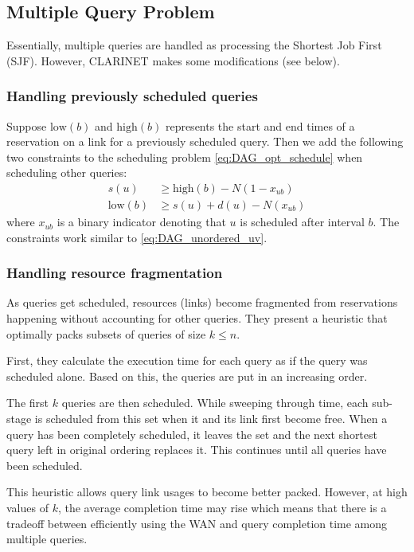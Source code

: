 \subsection{Multiple Query Problem}

Essentially, multiple queries are handled as processing the Shortest Job First (SJF).
However, CLARINET makes some modifications (see below).


\subsubsection{Handling previously scheduled queries}

Suppose $\text{low}(b)$ and $\text{high}(b)$ represents the start and end times of a reservation on a link for a previously scheduled query.
Then we add the following two constraints to the scheduling problem \eqref{eq:DAG_opt_schedule} when scheduling other queries:
\begin{subequations}
	\begin{align}
		s(u) & \geq \text{high}(b) - N(1-x_{ub}) \\
		\text{low}(b) & \geq s(u) + d(u) - N(x_{ub})
	\end{align}
\end{subequations}
where $x_{ub}$ is a binary indicator denoting that $u$ is scheduled after interval $b$.
The constraints work similar to \eqref{eq:DAG_unordered_uv}.


\subsubsection{Handling resource fragmentation}

As queries get scheduled, resources (links) become fragmented from reservations happening without accounting for other queries.
They present a heuristic that optimally packs subsets of queries of size $k\leq n$.

First, they calculate the execution time for each query as if the query was scheduled alone.
Based on this, the queries are put in an increasing order.

The first $k$ queries are then scheduled.
While sweeping through time, each sub-stage is scheduled from this set when it and its link first become free.
When a query has been completely scheduled, it leaves the set and the next shortest query left in original ordering replaces it.
This continues until all queries have been scheduled.

This heuristic allows query link usages to become better packed.
However, at high values of $k$, the average completion time may rise which means that there is a tradeoff between efficiently using the WAN and query completion time among multiple queries.

